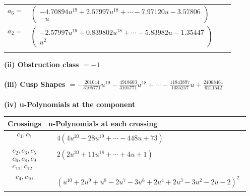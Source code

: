 \documentclass[1p]{elsarticle_modified}
\theoremstyle{definition}
\begin{document}
\begin{tabular}{m{7pt} m{180pt} m{7pt} m{180pt} }
\flushright $a_{6}=$&$\begin{pmatrix}-4.70894 u^{19}+2.57997 u^{18}+\cdots-7.97120 u-3.57806\\- u\end{pmatrix}$ \\
\flushright $a_{2}=$&$\begin{pmatrix}-2.57997 u^{19}+0.839802 u^{18}+\cdots-5.83982 u-1.35447\\u^2\end{pmatrix}$\\&\end{tabular}
\flushleft \textbf{(ii) Obstruction class $= -1$}\\~\\
\flushleft \textbf{(iii) Cusp Shapes $= -\frac{201044}{3105771} u^{19}-\frac{4918603}{3105771} u^{18}+\cdots-\frac{11843897}{1035257} u+\frac{24068461}{6211542}$}\\~\\
\newpage\renewcommand{\arraystretch}{1}
\flushleft \textbf{(iv) u-Polynomials at the component}\newline \\
\begin{tabular}{m{50pt}|m{274pt}}
Crossings & \hspace{64pt}u-Polynomials at each crossing \\
\hline $$\begin{aligned}c_{1},c_{7}\end{aligned}$$&$\begin{aligned}
&4(4 u^{20}-28 u^{19}+\cdots-448 u+73)
\end{aligned}$\\
\hline $$\begin{aligned}c_{2},c_{3},c_{5}\\c_{6},c_{8},c_{9}\\c_{11},c_{12}\end{aligned}$$&$\begin{aligned}
&2(2 u^{20}+11 u^{18}+\cdots+4 u+1)
\end{aligned}$\\
\hline $$\begin{aligned}c_{4},c_{10}\end{aligned}$$&$\begin{aligned}
&(u^{10}+2 u^9+u^8-2 u^7-3 u^6+2 u^4+2 u^3-3 u^2-2 u-2)^2
\end{aligned}$\\
\hline
\end{tabular}\\~\\
\end{document}
